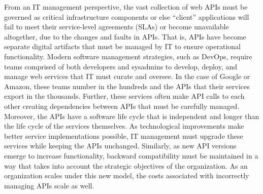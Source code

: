 \documentclass[10pt]{article}
\begin{document}
From an IT management perspective, the vast collection of web APIs must be
governed as critical infrastructure components or else ``client'' applications
will fail to meet their service-level agreements (SLAs)
or become unavailable altogether, due to the changes and faults in APIs.  
That is, APIs have become separate digital artifacts that 
must be managed by IT to ensure operational functionality.
Modern software management strategies, such as DevOps,
require teams comprised of both developers and sysadmins to develop, 
deploy, and manage web services
that IT must curate and oversee.  In the case of Google or Amazon, these
teams number in the hundreds and the APIs that their services export in the
thousands.  Further, these services often make API calls to each other 
creating dependencies between APIs that must be carefully managed.
Moreover, the APIs have a software life cycle that is
independent and longer than the life cycle of the services themselves. 
As technological improvements make better service implementations possible, IT
management must upgrade these services while keeping the APIs unchanged.
Similarly, as new API versions emerge to increase functionality, backward
compatibility must be maintained in a way that takes into
account the strategic objectives of the organization.  As an organization
scales under this new model, the costs associated with
incorrectly managing APIs scale as well.
\end{document}
